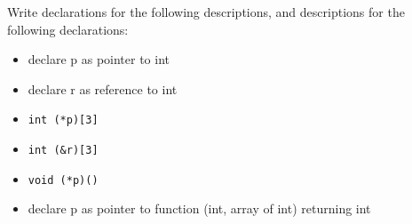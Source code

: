 Write declarations for the following descriptions, and descriptions for the
following declarations:
\begin{itemize}

  \item declare p as pointer to int
    \vfill

  \item declare r as reference to int
    \vfill

  \item \texttt{int (*p)[3]}
    \vfill

  \item \texttt{int (&r)[3]}
    \vfill

  \item \texttt{void (*p)()}
    \vfill

  \item declare p as pointer to function (int, array of int) returning int
    \vfill

\end{itemize}



